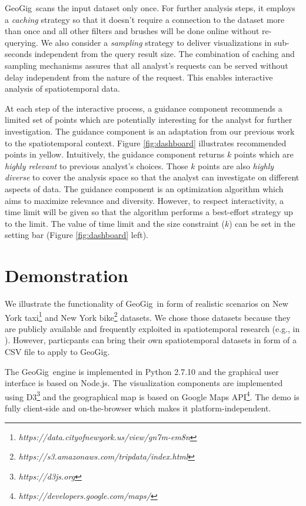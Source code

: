 \documentclass[conference]{IEEEtran}
\newcommand{\sys}{{\sc GeoGig}}
\begin{document}
\sys{}ans the input dataset only once. For further analysis steps, it employs a {\em caching} strategy so that it doesn't require a connection to the dataset more than once and all other filters and brushes will be done online without re-querying. We also consider a {\em sampling} strategy to deliver visualizations in sub-seconds independent from the query result size. The combination of caching and sampling mechanisms assures that all analyst's requests can be served without delay independent from the nature of the request. This enables interactive analysis of spatiotemporal data.

At each step of the interactive process, a guidance component recommends a limited set of points which are potentially interesting for the analyst for further investigation. The guidance component is an adaptation from our previous work~\cite{Omidvar-Tehrani:2015} to the spatiotemporal context. Figure \ref{fig:dashboard} illustrates recommended points in yellow. Intuitively, the guidance component returns $k$ points which are {\em highly relevant} to previous analyst's choices. Those $k$ points are also {\em highly diverse} to cover the analysis space so that the analyst can investigate on different aspects of data. The guidance component is an optimization algorithm which aims to maximize relevance and diversity. However, to respect interactivity, a time limit will be given so that the algorithm performs a best-effort strategy up to the limit. The value of time limit and the size constraint ($k$) can be set in the setting bar (Figure \ref{fig:dashboard} left).

\vspace{-5pt}
\section{Demonstration}

 We illustrate the functionality of \sys\ in form of realistic scenarios on New York taxi\footnote{\it https://data.cityofnewyork.us/view/gn7m-em8n} and New York bike\footnote{\it https://s3.amazonaws.com/tripdata/index.html} datasets. We chose those datasets because they are publicly available and frequently exploited in spatiotemporal research (e.g., in \cite{DBLP:journals/debu/FreireCVZ16}). However, particpants can bring their own spatiotemporal datasets in form of a CSV file to apply to \sys.

 The \sys\ engine is implemented in Python 2.7.10 and the graphical user interface is based on Node.js. The visualization components are implemented using {\sc D3}\footnote{\it https://d3js.org} and the geographical map is based on {\sc Google Maps API}\footnote{\it https://developers.google.com/maps/}. The demo is fully client-side and on-the-browser which makes it platform-independent. 
\end{document}
